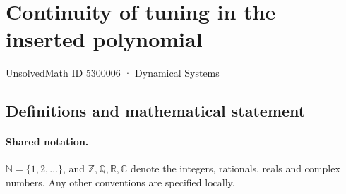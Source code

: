 \documentclass[11pt]{article}
\begin{document}
\setcounter{section}{5300005}
\section{Continuity of tuning in the inserted polynomial}\label{5300006}
{\small\sffamily UnsolvedMath ID 5300006 · Dynamical Systems}
\subsection{Definitions and mathematical statement}

\paragraph{Shared notation.}$\mathbb N=\{1,2,\ldots\}$, and $\mathbb Z,\mathbb Q,\mathbb R,\mathbb C$ denote the integers, rationals, reals and complex numbers. Any other conventions are specified locally.
\end{document}
